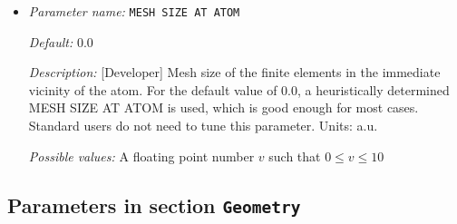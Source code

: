 \begin{itemize}
{\it Default:} 1.0


{\it Description:} [Standard] Mesh size in a ball of radius ATOM BALL RADIUS around every atom. For pseudopotential calculations, a value between 0.5 to 1.0 is usually a good choice. For all-electron calculations, a value between 0.1 to 0.3 would be a good starting choice. MESH SIZE AROUND ATOM is the only parameter standard users need to tune to achieve the desired accuracy in their results with respect to the mesh refinement. Units: a.u.


{\it Possible values:} A floating point number $v$ such that $0.0001 \leq v \leq 10$
\item {\it Parameter name:} {\tt MESH SIZE AT ATOM}
\label{parameters:Finite element mesh parameters/Auto mesh generation parameters/MESH SIZE AT ATOM}
\label{parameters:Finite_20element_20mesh_20parameters/Auto_20mesh_20generation_20parameters/MESH_20SIZE_20AT_20ATOM}




{\it Default:} 0.0


{\it Description:} [Developer] Mesh size of the finite elements in the immediate vicinity of the atom. For the default value of 0.0, a heuristically determined MESH SIZE AT ATOM is used, which is good enough for most cases. Standard users do not need to tune this parameter. Units: a.u.


{\it Possible values:} A floating point number $v$ such that $0 \leq v \leq 10$
\end{itemize}

\subsection{Parameters in section \tt Geometry}
\label{parameters:Geometry}

